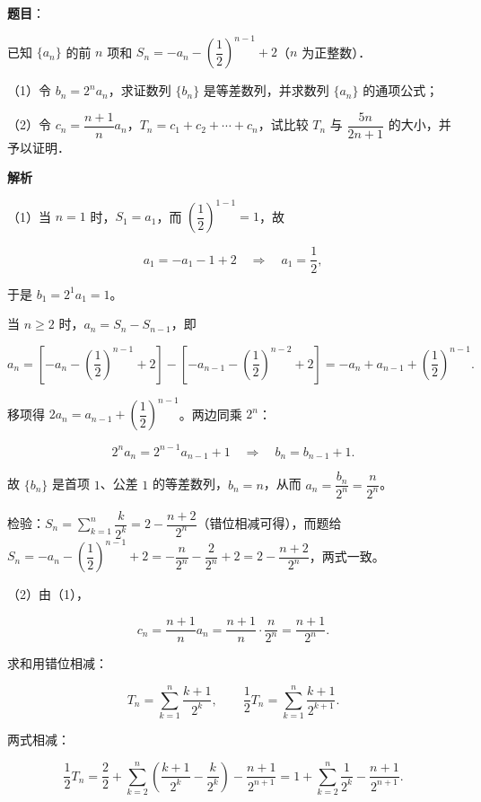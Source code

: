 \begin{answer}

\textbf{题目}：

已知 $\{a_n\}$ 的前 $n$ 项和 $S_n=-a_n-\left(\dfrac12\right)^{n-1}+2$（$n$ 为正整数）．

（1）令 $b_n=2^na_n$，求证数列 $\{b_n\}$ 是等差数列，并求数列 $\{a_n\}$ 的通项公式；

（2）令 $c_n=\dfrac{n+1}{n}a_n$，$T_n=c_1+c_2+\cdots+c_n$，试比较 $T_n$ 与 $\dfrac{5n}{2n+1}$ 的大小，并予以证明．

\textbf{解析}

（1）当 $n=1$ 时，$S_1=a_1$，而 $\left(\dfrac12\right)^{1-1}=1$，故

\nopagebreak[4]
\[a_1=-a_1-1+2\quad\Longrightarrow\quad a_1=\frac12,\]

于是 $b_1=2^1a_1=1$。

当 $n\geqslant2$ 时，$a_n=S_n-S_{n-1}$，即

\nopagebreak[4]
\[a_n=\left[-a_n-\left(\frac12\right)^{n-1}+2\right]-\left[-a_{n-1}-\left(\frac12\right)^{n-2}+2\right]
=-a_n+a_{n-1}+\left(\frac12\right)^{n-1}.\]

移项得 $2a_n=a_{n-1}+\left(\dfrac12\right)^{n-1}$。两边同乘 $2^n$：

\nopagebreak[4]
\[2^na_n=2^{n-1}a_{n-1}+1\quad\Longrightarrow\quad b_n=b_{n-1}+1.\]

故 $\{b_n\}$ 是首项 $1$、公差 $1$ 的等差数列，$b_n=n$，从而 $a_n=\dfrac{b_n}{2^n}=\dfrac{n}{2^n}$。

检验：$S_n=\sum_{k=1}^n\dfrac{k}{2^k}=2-\dfrac{n+2}{2^n}$（错位相减可得），而题给 $S_n=-a_n-\left(\dfrac12\right)^{n-1}+2=-\dfrac{n}{2^n}-\dfrac{2}{2^n}+2=2-\dfrac{n+2}{2^n}$，两式一致。

（2）由（1），

\nopagebreak[4]
\[c_n=\frac{n+1}{n}a_n=\frac{n+1}{n}\cdot\frac{n}{2^n}=\frac{n+1}{2^n}.\]

求和用错位相减：

\nopagebreak[4]
\[T_n=\sum_{k=1}^n\frac{k+1}{2^k},\qquad
\frac12T_n=\sum_{k=1}^n\frac{k+1}{2^{k+1}}.\]

两式相减：

\nopagebreak[4]
\[\frac12T_n=\frac{2}{2}+\sum_{k=2}^{n}\left(\frac{k+1}{2^k}-\frac{k}{2^k}\right)-\frac{n+1}{2^{n+1}}
=1+\sum_{k=2}^n\frac{1}{2^k}-\frac{n+1}{2^{n+1}}.\]


\end{answer}
